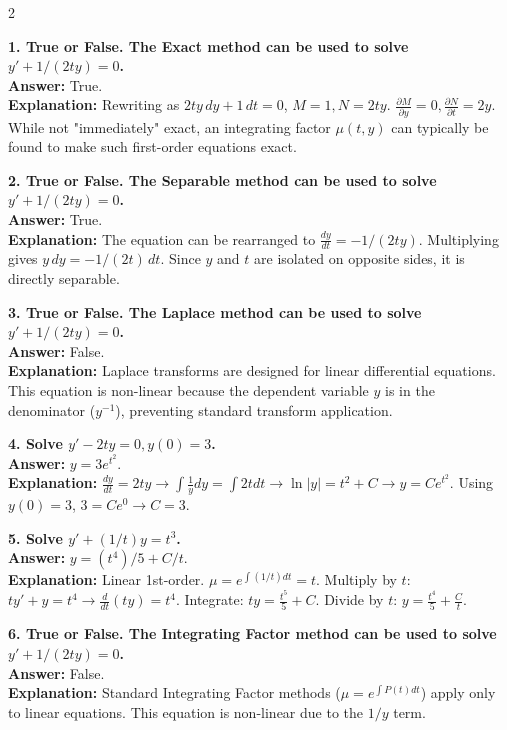 \documentclass[4pt]{extarticle}
\begin{document}
\fontsize{4}{5}\selectfont

\begin{multicols}{2}

\textbf{1. True or False. The Exact method can be used to solve $y' + 1/(2ty) = 0$.} \\
\textbf{Answer:} True. \\
\textbf{Explanation:} Rewriting as $2ty \, dy + 1 \, dt = 0$, $M = 1, N = 2ty$. $\frac{\partial M}{\partial y} = 0, \frac{\partial N}{\partial t} = 2y$. While not "immediately" exact, an integrating factor $\mu(t,y)$ can typically be found to make such first-order equations exact.

\textbf{2. True or False. The Separable method can be used to solve $y' + 1/(2ty) = 0$.} \\
\textbf{Answer:} True. \\
\textbf{Explanation:} The equation can be rearranged to $\frac{dy}{dt} = -1/(2ty)$. Multiplying gives $y \, dy = -1/(2t) \, dt$. Since $y$ and $t$ are isolated on opposite sides, it is directly separable.

\textbf{3. True or False. The Laplace method can be used to solve $y' + 1/(2ty) = 0$.} \\
\textbf{Answer:} False. \\
\textbf{Explanation:} Laplace transforms are designed for linear differential equations. This equation is non-linear because the dependent variable $y$ is in the denominator ($y^{-1}$), preventing standard transform application.

\textbf{4. Solve $y' - 2ty = 0, y(0)=3$.} \\
\textbf{Answer:} $y = 3e^{t^2}$. \\
\textbf{Explanation:} $\frac{dy}{dt} = 2ty \rightarrow \int \frac{1}{y} dy = \int 2t dt \rightarrow \ln|y| = t^2 + C \rightarrow y = Ce^{t^2}$. Using $y(0)=3$, $3 = Ce^0 \rightarrow C=3$.

\textbf{5. Solve $y' + (1/t)y = t^3$.} \\
\textbf{Answer:} $y = (t^4)/5 + C/t$. \\
\textbf{Explanation:} Linear 1st-order. $\mu = e^{\int (1/t)dt} = t$. Multiply by $t$: $t y' + y = t^4 \rightarrow \frac{d}{dt}(ty) = t^4$. Integrate: $ty = \frac{t^5}{5} + C$. Divide by $t$: $y = \frac{t^4}{5} + \frac{C}{t}$.

\textbf{6. True or False. The Integrating Factor method can be used to solve $y' + 1/(2ty) = 0$.} \\
\textbf{Answer:} False. \\
\textbf{Explanation:} Standard Integrating Factor methods ($\mu = e^{\int P(t)dt}$) apply only to linear equations. This equation is non-linear due to the $1/y$ term.


\end{multicols}
\end{document}
